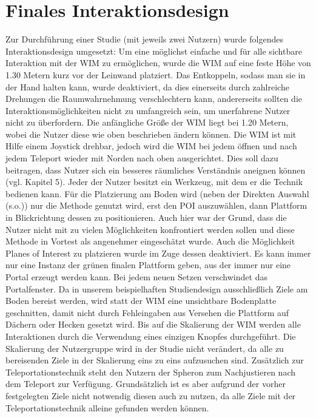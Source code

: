 \section{Finales Interaktionsdesign}
Zur Durchführung einer Studie (mit jeweils zwei Nutzern) wurde folgendes Interaktionsdesign umgesetzt:
Um eine möglichst einfache und für alle sichtbare Interaktion mit der WIM zu ermöglichen, wurde die WIM auf eine feste Höhe von 1.30 Metern kurz vor der Leinwand platziert. Das Entkoppeln, sodass man sie in der Hand halten kann, wurde deaktiviert, da dies einerseits durch zahlreiche Drehungen die Raumwahrnehmung verschlechtern kann, andererseits sollten die Interaktionsmöglichkeiten nicht zu umfangreich sein, um unerfahrene Nutzer nicht zu überfordern. Die anfängliche Größe der WIM liegt bei 1.20 Metern, wobei die Nutzer diese wie oben beschrieben ändern können.
Die WIM ist mit Hilfe einem Joystick drehbar, jedoch wird die WIM bei jedem öffnen und nach jedem Teleport wieder mit Norden nach oben ausgerichtet.
Dies soll dazu beitragen, dass Nutzer sich ein besseres räumliches Verständnis aneignen können (vgl. Kapitel 5).
Jeder der Nutzer besitzt ein Werkzeug, mit dem er die Technik bedienen kann. 
Für die Platzierung am Boden wird (neben der \glqq Direkten Auswahl\grqq{} (s.o.)) nur die Methode genutzt wird, erst den POI auszuwählen, dann Plattform in Blickrichtung dessen zu positionieren. Auch hier war der Grund, dass die Nutzer nicht mit zu vielen Möglichkeiten konfrontiert werden sollen und diese Methode in Vortest als angenehmer eingeschätzt wurde.
Auch die Möglichkeit Planes of Interest zu platzieren wurde im Zuge dessen deaktiviert. Es kann immer nur eine Instanz der grünen finalen Plattform geben, aus der immer nur eine Portal erzeugt werden kann.
Bei jedem neuen Setzen verschwindet das Portalfenster.
Da in unserem beispielhaften Studiendesign ausschließlich Ziele am Boden bereist werden, wird statt der WIM eine unsichtbare Bodenplatte geschnitten, damit nicht durch Fehleingaben aus Versehen die Plattform auf Dächern oder Hecken gesetzt wird.
Bis auf die Skalierung der WIM werden alle Interaktionen durch die Verwendung eines einzigen Knopfes durchgeführt.
Die Skalierung der Nutzergruppe wird in der Studie nicht verändert, da alle zu bereisenden Ziele in der Skalierung eins zu eins aufzusuchen sind.
Zusätzlich zur Teleportationstechnik steht den Nutzern der Spheron zum Nachjustieren nach dem Teleport zur Verfügung. Grundsätzlich ist es aber aufgrund der vorher festgelegten Ziele nicht notwendig diesen auch zu nutzen, da alle Ziele mit der Teleportationstechnik alleine gefunden werden können.